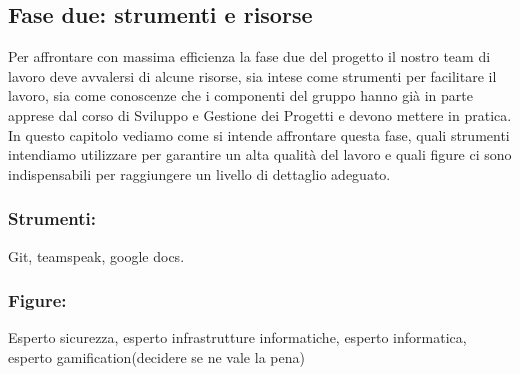 \subsection{Fase due: strumenti e risorse}
Per affrontare con massima efficienza la fase due del progetto il nostro team di lavoro deve avvalersi di alcune risorse, sia intese come strumenti per facilitare il lavoro, sia come conoscenze che i componenti del gruppo hanno già in parte apprese dal corso di Sviluppo e Gestione dei Progetti e devono mettere in pratica. In questo capitolo vediamo come si intende affrontare questa fase, quali strumenti intendiamo utilizzare per garantire un alta qualità del lavoro e quali figure ci sono indispensabili per raggiungere un livello di dettaglio adeguato.

\subsubsection{Strumenti:}
Git, teamspeak, google docs.

\subsubsection{Figure:}
Esperto sicurezza, esperto infrastrutture informatiche, esperto informatica, esperto gamification(decidere se ne vale la pena)



